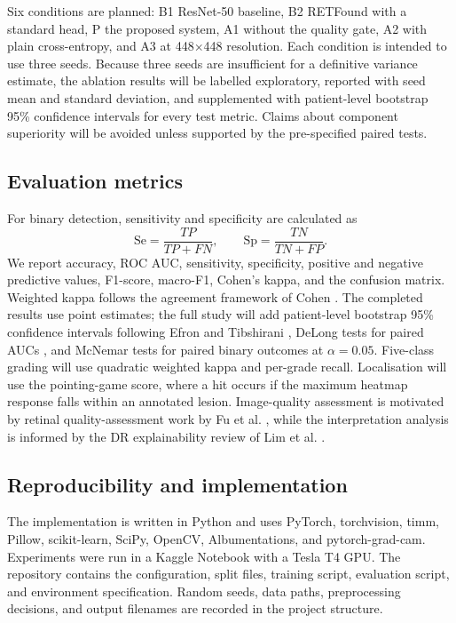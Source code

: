 \documentclass[11pt,a4paper]{article}
\begin{document}
Six conditions are planned: B1 ResNet-50 baseline, B2 RETFound with a standard head, P the proposed system, A1 without the quality gate, A2 with plain cross-entropy, and A3 at 448$\times$448 resolution. Each condition is intended to use three seeds. Because three seeds are insufficient for a definitive variance estimate, the ablation results will be labelled exploratory, reported with seed mean and standard deviation, and supplemented with patient-level bootstrap 95\% confidence intervals for every test metric. Claims about component superiority will be avoided unless supported by the pre-specified paired tests.

\subsection{Evaluation metrics}
For binary detection, sensitivity and specificity are calculated as
\begin{equation} \mathrm{Se}=\frac{TP}{TP+FN},\qquad \mathrm{Sp}=\frac{TN}{TN+FP}. \end{equation}
We report accuracy, ROC AUC, sensitivity, specificity, positive and negative predictive values, F1-score, macro-F1, Cohen's kappa, and the confusion matrix. Weighted kappa follows the agreement framework of Cohen \cite{cohen1968}. The completed results use point estimates; the full study will add patient-level bootstrap 95\% confidence intervals following Efron and Tibshirani \cite{efron1993}, DeLong tests for paired AUCs \cite{delong1988}, and McNemar tests for paired binary outcomes \cite{mcnemar1947} at $\alpha=0.05$. Five-class grading will use quadratic weighted kappa and per-grade recall. Localisation will use the pointing-game score, where a hit occurs if the maximum heatmap response falls within an annotated lesion. Image-quality assessment is motivated by retinal quality-assessment work by Fu et al. \cite{fu2019}, while the interpretation analysis is informed by the DR explainability review of Lim et al. \cite{lim2022}.

\subsection{Reproducibility and implementation}
The implementation is written in Python and uses PyTorch, torchvision, timm, Pillow, scikit-learn, SciPy, OpenCV, Albumentations, and pytorch-grad-cam. Experiments were run in a Kaggle Notebook with a Tesla T4 GPU. The repository contains the configuration, split files, training script, evaluation script, and environment specification. Random seeds, data paths, preprocessing decisions, and output filenames are recorded in the project structure.
\end{document}
